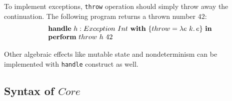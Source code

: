 \documentclass[acmsmall]{acmart}
\newcommand{\ap}{~}
\newcommand{\keyword}[1]{\mathbf{#1}}
\begin{document}
To implement exceptions, \texttt{throw} operation should simply throw away the continuation.
The following program returns a thrown number $42$:
\[
    \begin{array}{l}
        \keyword{handle}~ h : Exception\ap Int ~\keyword{with}~ \{throw = \lambda e~k\ldotp e \} ~\keyword{in} \\
        \keyword{perform}~throw~h~42
    \end{array}
\]

Other algebraic effects like mutable state and nondeterminism can be implemented with \texttt{handle} construct as well. %


\subsection{Syntax of $Core$} \label{subsec:syntax-core}
\end{document}
